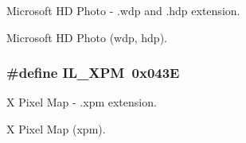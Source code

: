 Microsoft H\+D Photo -\/ .wdp and .hdp extension. 

Microsoft H\+D Photo (wdp, hdp). \hypertarget{group__il__formats_ga3f15f93b91a09441f3e7352ade9c6b46}{
\subsubsection[{I\+L\+\_\+\+X\+P\+M}]{\setlength{\rightskip}{0pt plus 5cm}\#define I\+L\+\_\+\+X\+P\+M~0x043\+E}}\label{group__il__formats_ga3f15f93b91a09441f3e7352ade9c6b46}


X Pixel Map -\/ .xpm extension. 

X Pixel Map (xpm). 